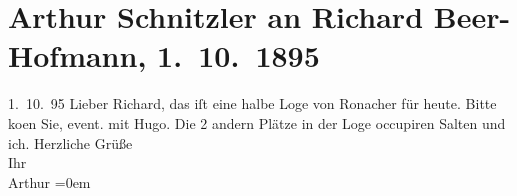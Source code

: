 

         
         \renewcommand{\erwaehntePersonen}{Personen: Richard Beer-Hofmann, Hugo von Hofmannsthal, Felix Salten}
         \renewcommand{\erwaehnteOrte}{Orte: Ronacher, Wien}
         \renewcommand{\erwaehnteWerke}{}
               \section[Arthur Schnitzler an Richard Beer-Hofmann, 1. 10. 1895]{ Arthur Schnitzler an Richard Beer-Hofmann, 1. 10. 1895}\nopagebreak{}\rehead{ }\begin{ledgroupsized}[t]{13cm}\normalsize\beginnumbering \toendnotes[C]{\smallbreak\pagebreak[2]} 
\pstart
           \raggedleft{}{\pb}1. 10. 95\pend
           \pstart{}Lieber Richard,\pend\pstart
           das iſt eine halbe Loge von Ronacher für heute. Bitte
                  ko{\geminationm}en Sie, event. {\pb}mit
                  Hugo.\pend
           \pstart
           Die 2 andern Plätze in der Loge occupiren Salten
               und ich.\pend
           \pstart
           {\pb}Herzliche Grüße{\\[\baselineskip]}Ihr{\\[\baselineskip]}\spacefill\mbox{Arthur}\pend
           \leftskip=0em{}
         
         \endnumbering{}\end{ledgroupsized}  \newcommand{\dateiname}{L00496}\newcommand{\titel}{Arthur Schnitzler an Richard Beer-Hofmann, 1. 10. 1895}\newcommand{\editorInnen}{Martin Anton Müller und Gerd-Hermann Susen}
      